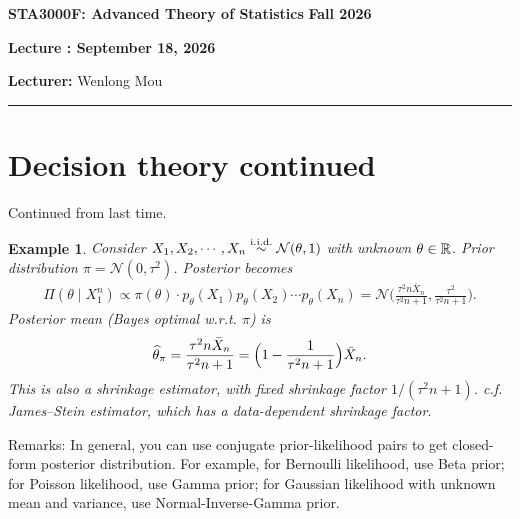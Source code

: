 \documentclass[11pt,letterpaper]{article}
\newcommand{\coursenumber}{STA3000F}
\newcommand{\coursetitle}{Advanced Theory of Statistics}
\newcommand{\courseterm}{Fall 2026}
\newcounter{lecture}
\newcommand{\lecturenumber}{\arabic{lecture}}
\newcommand{\lecturedate}{September 18, 2026}
\newcommand{\lecturer}{Wenlong Mou}
\newtheorem{example}{Example}
\numberwithin{theorem}{lecture}
\numberwithin{proposition}{lecture}
\numberwithin{lemma}{lecture}
\numberwithin{claim}{lecture}
\numberwithin{corollary}{lecture}
\numberwithin{definition}{lecture}
\numberwithin{conjecture}{lecture}
\numberwithin{remark}{lecture}
\numberwithin{example}{lecture}
\numberwithin{equation}{lecture}
\newcommand{\makelecturenotesheader}{%
  \noindent
  \textbf{\coursenumber: \coursetitle}%
  \hfill
  \textbf{\courseterm}

  \begin{center}
    {\Large\bfseries Lecture \lecturenumber: \lecturedate}
  \end{center}

  \noindent
  \textbf{Lecturer:} \lecturer
  \par\medskip
  \hrule
  \bigskip
}
\begin{document}
\makelecturenotesheader

\section{Decision theory continued}
Continued from last time.
\begin{example}
  Consider $X_1, X_2, \cdots, X_n \overset{\mathrm{i.i.d.}}{\sim} \mathcal{N} (\theta, 1)$ with unknown $\theta \in \mathbb{R}$. Prior distribution $\pi = \mathcal{N} (0, \tau^2)$. Posterior becomes
  \begin{align*}
    \Pi (\theta \mid X_1^n) \propto \pi (\theta) \cdot p_\theta (X_1) p_\theta (X_2) \cdots p_\theta (X_n) = \mathcal{N} \Big( \frac{\tau^2 n \bar{X}_n}{\tau^2n + 1}, \frac{\tau^2}{\tau^2 n + 1} \Big).
  \end{align*}
  Posterior mean (Bayes optimal w.r.t. $\pi$) is
  \begin{align*}
    \widehat{\theta}_\pi = \frac{\tau^2 n \bar{X}_n}{\tau^2 n + 1} = \Big( 1 - \frac{1}{\tau^2 n + 1} \Big) \bar{X}_n.
  \end{align*}
  This is also a shrinkage estimator, with fixed shrinkage factor $1/(\tau^2 n + 1)$. c.f. James--Stein estimator, which has a data-dependent shrinkage factor.
\end{example}
Remarks: In general, you can use conjugate prior-likelihood pairs to get closed-form posterior distribution. For example, for Bernoulli likelihood, use Beta prior; for Poisson likelihood, use Gamma prior; for Gaussian likelihood with unknown mean and variance, use Normal-Inverse-Gamma prior.
\end{document}
